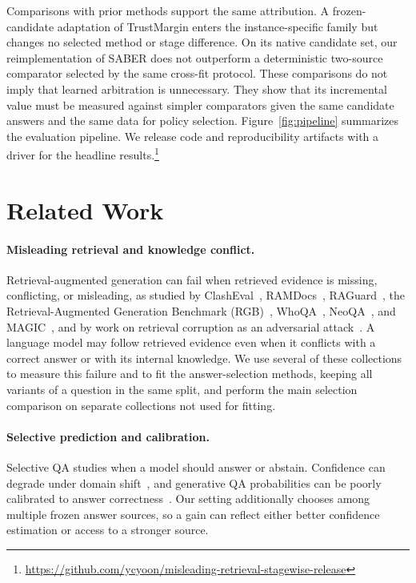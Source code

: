 \documentclass[sigconf]{acmart}
\begin{document}
Comparisons with prior methods support the same attribution. A
frozen-candidate adaptation of TrustMargin enters the instance-specific
family but changes no selected method or stage difference. On its native
candidate set, our reimplementation of SABER does not outperform a
deterministic two-source
comparator selected by the same cross-fit protocol. These comparisons
do not imply that learned arbitration is unnecessary. They show that
its incremental value must be measured against simpler comparators
given the same candidate answers and the same data for policy selection.
Figure~\ref{fig:pipeline} summarizes the evaluation pipeline. We release
code and reproducibility artifacts with a driver for the headline
results.\footnote{\url{https://github.com/ycyoon/misleading-retrieval-stagewise-release}}

\section{Related Work}\label{sec:related}

\paragraph{Misleading retrieval and knowledge conflict.}
Retrieval-augmented generation can fail when retrieved evidence is missing, conflicting, or misleading, as studied by ClashEval~\cite{wu2024clasheval}, RAMDocs~\cite{wang2025ramdocs}, RAGuard~\cite{raguard2024}, the Retrieval-Augmented Generation Benchmark (RGB)~\cite{chen2024rgb}, WhoQA~\cite{pham2024whoqa}, NeoQA~\cite{glockner2025neoqa}, and MAGIC~\cite{lee2025magic}, and by work on retrieval corruption as an adversarial attack~\cite{zou2025poisonedrag,xiang2026robustrag,tan2025revprag}. A language model may follow retrieved evidence even when it conflicts with a correct answer or with its internal knowledge. We use several of these collections to measure this failure and to fit the answer-selection methods, keeping all variants of a question in the same split, and perform the main selection comparison on separate collections not used for fitting.

\paragraph{Selective prediction and calibration.}
Selective QA studies when a model should answer or abstain. Confidence
can degrade under domain shift~\cite{kamath2020selective}, and
generative QA probabilities can be poorly calibrated to answer
correctness~\cite{jiang2021calibration}. Our setting additionally
chooses among multiple frozen answer sources, so a gain can reflect
either better confidence estimation or access to a stronger source.
\end{document}

